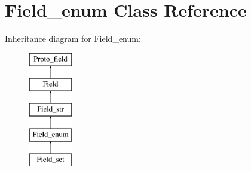 \hypertarget{classField__enum}{}\section{Field\+\_\+enum Class Reference}
\label{classField__enum}
Inheritance diagram for Field\+\_\+enum\+:\begin{figure}[H]
\begin{center}
\leavevmode
\includegraphics[height=5.000000cm]{classField__enum}
\end{center}
\end{figure}

